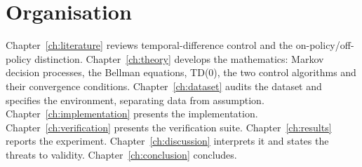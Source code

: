 \section{Organisation}

Chapter~\ref{ch:literature} reviews temporal-difference control and the on-policy/off-policy
distinction. Chapter~\ref{ch:theory} develops the mathematics: Markov decision processes, the
Bellman equations, TD(0), the two control algorithms and their convergence conditions.
Chapter~\ref{ch:dataset} audits the dataset and specifies the environment, separating data from
assumption. Chapter~\ref{ch:implementation} presents the implementation.
Chapter~\ref{ch:verification} presents the verification suite. Chapter~\ref{ch:results} reports the
experiment. Chapter~\ref{ch:discussion} interprets it and states the threats to validity.
Chapter~\ref{ch:conclusion} concludes.
